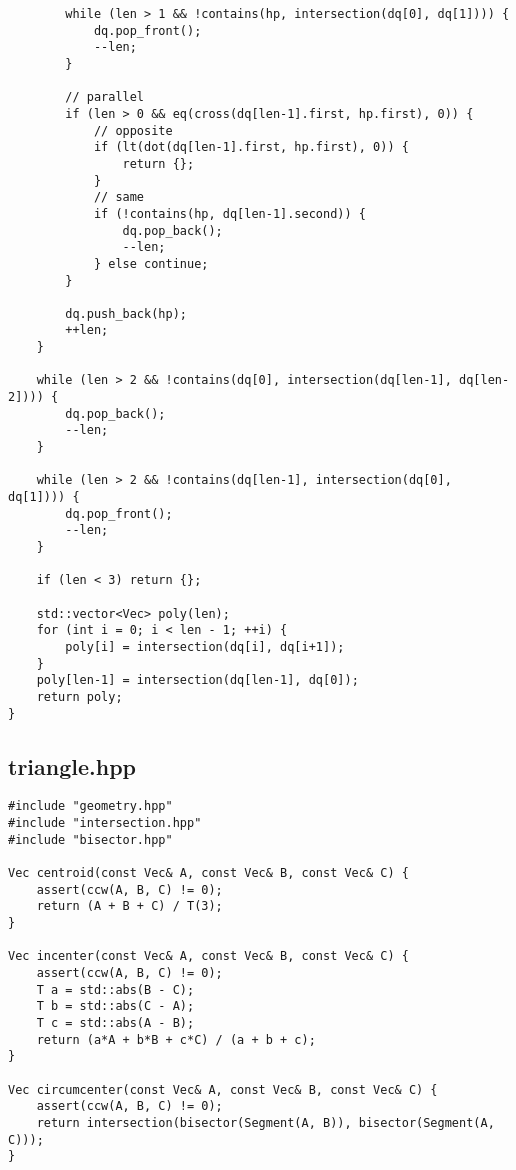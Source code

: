 \begin{lstlisting}
        while (len > 1 && !contains(hp, intersection(dq[0], dq[1]))) {
            dq.pop_front();
            --len;
        }

        // parallel
        if (len > 0 && eq(cross(dq[len-1].first, hp.first), 0)) {
            // opposite
            if (lt(dot(dq[len-1].first, hp.first), 0)) {
                return {};
            }
            // same
            if (!contains(hp, dq[len-1].second)) {
                dq.pop_back();
                --len;
            } else continue;
        }

        dq.push_back(hp);
        ++len;
    }

    while (len > 2 && !contains(dq[0], intersection(dq[len-1], dq[len-2]))) {
        dq.pop_back();
        --len;
    }

    while (len > 2 && !contains(dq[len-1], intersection(dq[0], dq[1]))) {
        dq.pop_front();
        --len;
    }

    if (len < 3) return {};

    std::vector<Vec> poly(len);
    for (int i = 0; i < len - 1; ++i) {
        poly[i] = intersection(dq[i], dq[i+1]);
    }
    poly[len-1] = intersection(dq[len-1], dq[0]);
    return poly;
}

\end{lstlisting}

\subsection{triangle.hpp}

\begin{small}
\begin{markdown}

\end{markdown}
\end{small}

\begin{lstlisting}
#include "geometry.hpp"
#include "intersection.hpp"
#include "bisector.hpp"

Vec centroid(const Vec& A, const Vec& B, const Vec& C) {
    assert(ccw(A, B, C) != 0);
    return (A + B + C) / T(3);
}

Vec incenter(const Vec& A, const Vec& B, const Vec& C) {
    assert(ccw(A, B, C) != 0);
    T a = std::abs(B - C);
    T b = std::abs(C - A);
    T c = std::abs(A - B);
    return (a*A + b*B + c*C) / (a + b + c);
}

Vec circumcenter(const Vec& A, const Vec& B, const Vec& C) {
    assert(ccw(A, B, C) != 0);
    return intersection(bisector(Segment(A, B)), bisector(Segment(A, C)));
}
\end{lstlisting}

